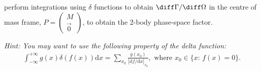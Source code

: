 
perform integrations using $\delta$ functions to obtain $\diff \Gamma/\diff\Omega$ in the centre of mass frame, $P = \begin{pmatrix}M\\\vec{0}\end{pmatrix}$,
to obtain the 2-body phase-space factor.

    {\em Hint: You may want to use the following property of the delta function:}
\begin{align*}
    \int_{-\infty}^{+\infty} g(x) \delta(f(x)) \text{d}x = \sum_{x_0} \frac{g(x_0)}{|\text{d}f/\text{d}x|_{x_0}}, %
    \text{ where } x_0 \in \{x:\, f(x)=0\}.
\end{align*}


